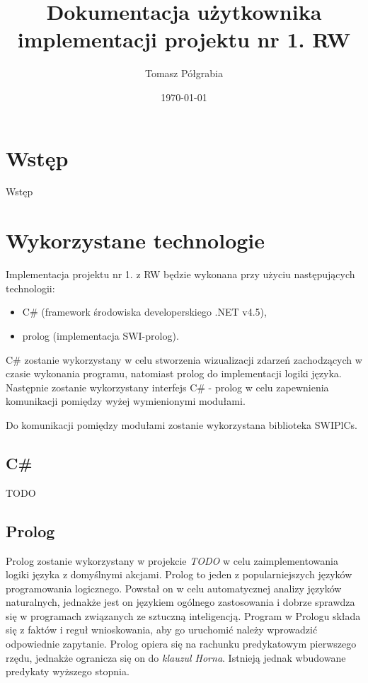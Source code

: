 \documentclass[a4paper]{article}
\title{Dokumentacja użytkownika implementacji projektu nr 1. RW}
\author{Tomasz Półgrabia}
\date{\today}
\begin{document}
\maketitle

\begin{abstract}

\end{abstract}

\section{Wstęp}
	Wstęp

\section{Wykorzystane technologie}
	Implementacja projektu nr 1. z RW będzie wykonana przy użyciu następujących technologii:
    \begin{itemize}
    	\item C\# (framework środowiska developerskiego .NET v4.5),
        \item prolog (implementacja SWI-prolog).
    \end{itemize}
    
    C\# zostanie wykorzystany w celu stworzenia wizualizacji zdarzeń zachodzących w czasie wykonania
    programu, natomiast prolog do implementacji logiki języka. Następnie zostanie wykorzystany
    interfejs C\# - prolog w celu zapewnienia komunikacji pomiędzy wyżej wymienionymi modułami.
    
    Do komunikacji pomiędzy modułami zostanie wykorzystana biblioteka SWIPlCs.
    
    \subsection{C\#}
    	TODO
    
    \subsection{Prolog}
    Prolog zostanie wykorzystany w projekcie \textit{TODO} w celu
    zaimplementowania logiki języka z domyślnymi akcjami. Prolog to
    jeden z popularniejszych języków programowania logicznego. Powstał on
    w celu automatycznej analizy języków naturalnych, jednakże jest on
    językiem ogólnego zastosowania i dobrze sprawdza się w programach 
    związanych ze sztuczną inteligencją. Program w Prologu składa się z faktów
    i reguł wnioskowania, aby go uruchomić należy wprowadzić odpowiednie 
    zapytanie. Prolog opiera się na rachunku predykatowym pierwszego rzędu,
    jednakże ogranicza się on do \textit{klauzul Horna}. Istnieją jednak
    wbudowane predykaty wyższego stopnia.
\end{document}
